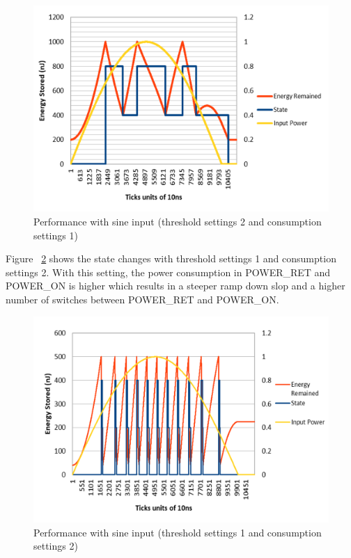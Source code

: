 \documentclass[conference]{IEEEtran}
\begin{document}
\begin{figure}[htbp]
\centerline{\includegraphics[scale=0.3]{sinediffthresh3.png}}
\caption{Performance with sine input (threshold settings 2 and consumption settings 1)}
\label{sinediffthresh3}
\end{figure}

Figure ~\ref{sinediffcons3} shows the state changes with threshold settings 1 and consumption settings 2. With this setting, the power consumption in POWER\_RET and POWER\_ON is higher which results in a steeper ramp down slop and a higher number of switches between POWER\_RET and POWER\_ON. 

\begin{figure}[htbp]
\centerline{\includegraphics[scale=0.3]{sinediffcons3.png}}
\caption{Performance with sine input (threshold settings 1 and consumption settings 2)}
\label{sinediffcons3}
\end{figure}
\end{document}
